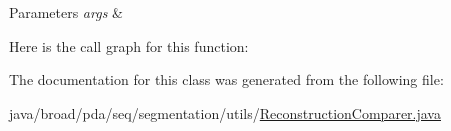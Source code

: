 \begin{DoxyParams}{Parameters}
{\em args} & \\
\hline
\end{DoxyParams}


Here is the call graph for this function\+:




The documentation for this class was generated from the following file\+:\begin{DoxyCompactItemize}
\item 
java/broad/pda/seq/segmentation/utils/\hyperlink{_reconstruction_comparer_8java}{Reconstruction\+Comparer.\+java}\end{DoxyCompactItemize}
